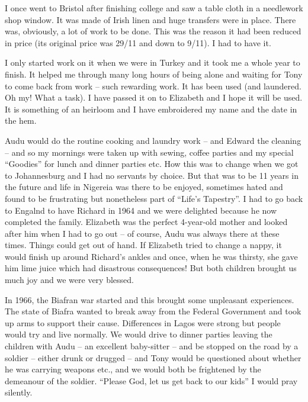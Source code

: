 I once went to Bristol after finishing college and saw a table cloth
in a needlework shop window. It was made of Irish linen and huge
transfers were in place. There was, obviously, a lot of work to be
done. This was the reason it had been reduced in price (its original
price was 29/11 and down to 9/11). I had to have it.

I only started work on it when we were in Turkey and it took me a
whole year to finish. It helped me through many long hours of being
alone and waiting for Tony to come back from work -- such rewarding
work. It has been used (and laundered. Oh my! What a task). I have
passed it on to Elizabeth and I hope it will be used. It is something
of an heirloom and I have embroidered my name and the date in the hem.

Audu would do the routine cooking and laundry work -- and Edward the
cleaning -- and so my mornings were taken up with sewing, coffee
parties and my special ``Goodies'' for lunch and dinner parties
etc. How this was to change when we got to Johannesburg and I had no
servants by choice. But that was to be 11 years in the future and life
in Nigereia was there to be enjoyed, sometimes hated and found to be
frustrating but nonetheless part of ``Life's Tapestry''. I had to go
back to Engalnd to have Richard in 1964 and we were delighted because
he now completed the family. Elizabeth was the perfect 4-year-old
mother and looked after him when I had to go out -- of course, Audu
was always there at these times. Things could get out of hand. If
Elizabeth tried to change a nappy, it would finish up around Richard's
ankles and once, when he was thirsty, she gave him lime juice which
had disastrous consequences! But both children brought us much joy and
we were very blessed.

In 1966, the Biafran war started and this brought some unpleasant
experiences. The state of Biafra wanted to break away from the Federal
Government and took up arms to support their cause. Differences in
Lagos were strong but people would try and live normally. We would
drive to dinner parties leaving the children with Audu -- an excellent
baby-sitter -- and be stopped on the road by a soldier -- either drunk
or drugged -- and Tony would be questioned about whether he was
carrying weapons etc., and we would both be frightened by the
demeanour of the soldier. ``Please God, let us get back to our kids''
I would pray silently.

